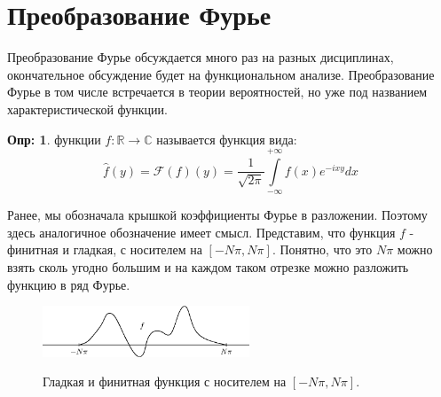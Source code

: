\documentclass[12pt]{article}
\newcommand{\MR}{\mathbb{R}}
\newcommand{\MC}{\mathbb{C}}
\theoremstyle{definition}
\newtheorem{defn}{Опр:}
\newcommand{\ddint}[2]{\displaystyle\int\limits_{#1}^{#2}}
\newcommand{\fourt}[1]{\mathcal{F}\left(#1\right)}
\begin{document}
\newpage
\section*{Преобразование Фурье}
Преобразование Фурье обсуждается много раз на разных дисциплинах, окончательное обсуждение будет на функциональном анализе. Преобразование Фурье в том числе встречается в теории вероятностей, но уже под названием характеристической функции.
\begin{defn}
	 функции $f \colon \MR \to \MC$ называется функция вида: 
	$$
		\widehat{f}(y) = \fourt{f}(y) =  \dfrac{1}{\sqrt{2\pi}}\ddint{-\infty}{+\infty}f(x)e^{-ixy}dx
	$$
\end{defn}
Ранее, мы обозначала крышкой коэффициенты Фурье в разложении. Поэтому здесь аналогичное обозначение имеет смысл. Представим, что функция $f$ - финитная и гладкая, с носителем на $[-N\pi,N\pi]$. Понятно, что это $N\pi$ можно взять сколь угодно большим и на каждом таком отрезке можно разложить функцию в ряд Фурье. 
\begin{figure}[H]
	\centering
	\includegraphics[width=0.55\textwidth]{MA3L29_1.eps}
	\label{MA3L29_1}
	\caption{Гладкая и финитная функция с носителем на $[-N\pi,N\pi]$.}
	\label{fig: Финитная функция }
\end{figure}
\end{document}
